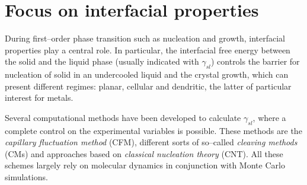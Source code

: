 %
%




\section{Focus on interfacial properties}
During first--order phase transition such as nucleation and growth, interfacial properties play a central role. In particular, the interfacial free energy between the solid and the liquid phase (usually indicated with $\gamma_{sl}$) controls the barrier for nucleation of solid in an undercooled liquid and the crystal growth, which can present different regimes: planar, cellular and dendritic, the latter of particular interest for metals.


Several computational methods have been developed to calculate $\gamma_{sl}$, where a complete control on the experimental variables is possible. These methods are the \emph{capillary fluctuation method} (CFM), different sorts of so--called \emph{cleaving methods} (CMs) and approaches based on \emph{classical nucleation theory} (CNT). All these schemes largely rely on molecular dynamics in conjunction with Monte Carlo simulations.

